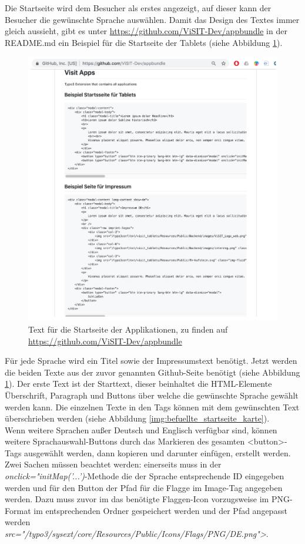 Die Startseite wird dem Besucher als erstes angezeigt, auf dieser kann der Besucher die gewünschte Sprache auswählen. Damit das Design des Textes immer gleich aussieht, gibt es unter \url{https://github.com/ViSIT-Dev/appbundle} in der README.md ein Beispiel für die Startseite der Tablets (siehe Abbildung \ref{img:github_link}).

\begin{figure}[ht!]
\centering
\includegraphics[width=12cm]{Figures/paula/karte/github_link.png}
\caption{Text für die Startseite der Applikationen, zu finden auf \url{https://github.com/ViSIT-Dev/appbundle}}
\label{img:github_link}
\end{figure}

Für jede Sprache wird ein Titel sowie der Impressumstext benötigt. Jetzt werden die beiden Texte aus der zuvor genannten Github-Seite benötigt (siehe Abbildung \ref{img:github_link}). Der erste Text ist der Starttext, dieser beinhaltet die HTML-Elemente Überschrift, Paragraph und Buttons über welche die gewünschte Sprache gewählt werden kann. Die einzelnen Texte in den Tags können mit dem gewünschten Text überschrieben werden (siehe Abbildung \ref{img:befuellte_startseite_karte}).\\
Wenn weitere Sprachen außer Deutsch und Englisch verfügbar sind, können weitere Sprachauswahl-Buttons durch das Markieren des gesamten <button>-Tags ausgewählt werden, dann kopieren und darunter einfügen, erstellt werden. Zwei Sachen müssen beachtet werden: einerseits muss in der \textit{onclick="initMap('...')}-Methode die der Sprache entsprechende ID eingegeben werden und für den Button der Pfad für die Flagge im Image-Tag angegeben werden. Dazu muss zuvor im das benötigte Flaggen-Icon vorzugsweise im PNG-Format im entsprechenden Ordner gespeichert werden und der Pfad angepasst werden\\ \textit{src="/typo3/sysext/core/Resources/Public/Icons/Flags/PNG/DE.png">}. 


